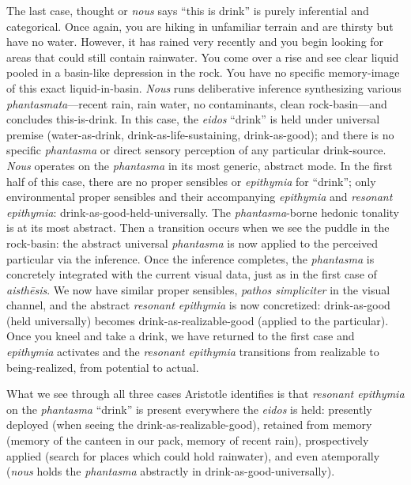 \documentclass{article}
\begin{document}
The last case, thought or \textit{nous} says ``this is drink'' is purely inferential and categorical. Once again, you are hiking in unfamiliar terrain and are thirsty but have no water. However, it has rained very recently and you begin looking for areas that could still contain rainwater. You come over a rise and see clear liquid pooled in a basin-like depression in the rock. You have no specific memory-image of this exact liquid-in-basin. \textit{Nous} runs deliberative inference synthesizing various \textit{phantasmata}---recent rain, rain water, no contaminants, clean rock-basin---and concludes this-is-drink. In this case, the \textit{eidos} ``drink'' is held under universal premise (water-as-drink, drink-as-life-sustaining, drink-as-good); and there is no specific \textit{phantasma} or direct sensory perception of any particular drink-source. \textit{Nous} operates on the \textit{phantasma} in its most generic, abstract mode. In the first half of this case, there are no proper sensibles or \textit{epithymia} for ``drink''; only environmental proper sensibles and their accompanying \textit{epithymia} and \textit{resonant epithymia}: drink-as-good-held-universally. The \textit{phantasma}-borne hedonic tonality is at its most abstract. Then a transition occurs when we see the puddle in the rock-basin: the abstract universal \textit{phantasma} is now applied to the perceived particular via the inference. Once the inference completes, the \textit{phantasma} is concretely integrated with the current visual data, just as in the first case of \textit{aisthēsis}. We now have similar proper sensibles, \textit{pathos simpliciter} in the visual channel, and the abstract \textit{resonant epithymia} is now concretized: drink-as-good (held universally) becomes drink-as-realizable-good (applied to the particular). Once you kneel and take a drink, we have returned to the first case and \textit{epithymia} activates and the \textit{resonant epithymia} transitions from realizable to being-realized, from potential to actual. 

What we see through all three cases Aristotle identifies is that \textit{resonant epithymia} on the \textit{phantasma} ``drink'' is present everywhere the \textit{eidos} is held: presently deployed (when seeing the drink-as-realizable-good), retained from memory (memory of the canteen in our pack, memory of recent rain), prospectively applied (search for places which could hold rainwater), and even atemporally (\textit{nous} holds the \textit{phantasma} abstractly in drink-as-good-universally). 
\end{document}
